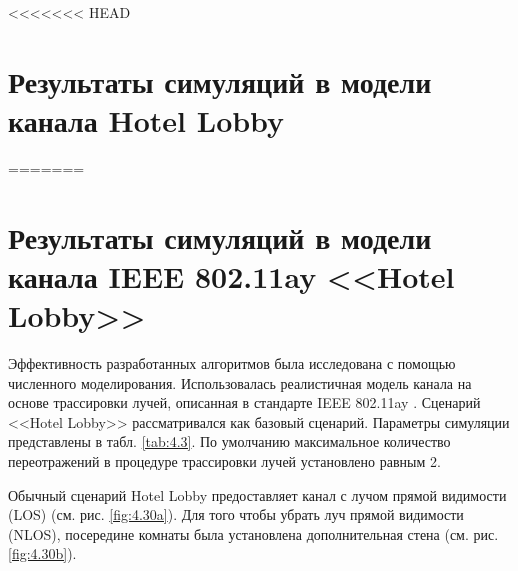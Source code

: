 <<<<<<< HEAD
\section{Результаты симуляций в модели канала Hotel Lobby}
=======
\section{Результаты симуляций в модели канала IEEE 802.11ay <<Hotel Lobby>>}
\label{sec:simulations}
Эффективность разработанных алгоритмов была исследована с помощью численного
моделирования. Использовалась реалистичная модель канала на основе трассировки
лучей, описанная в стандарте IEEE 802.11ay  \cite{Maltsev2017}. Сценарий
<<Hotel Lobby>> рассматривался как базовый сценарий.
Параметры симуляции представлены в табл. \ref{tab:4.3}.
По умолчанию максимальное количество переотражений в процедуре
трассировки лучей установлено равным 2.

Обычный сценарий Hotel Lobby предоставляет канал с лучом прямой видимости (LOS)
(см. рис. \ref{fig:4.30a}). Для того чтобы убрать луч прямой видимости (NLOS),
посередине комнаты была установлена дополнительная стена
(см. рис. \ref{fig:4.30b}).


